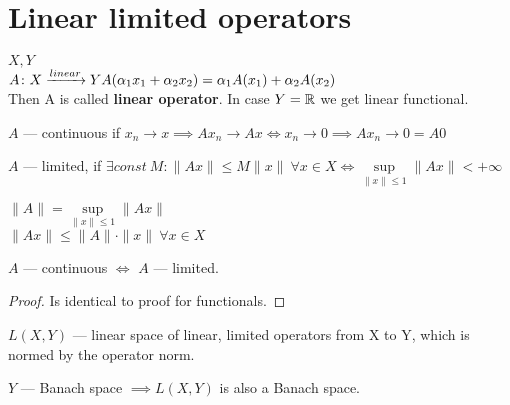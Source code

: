 \section{Linear limited operators}
\begin{defn}
  $X, Y$ \\
  $A \colon X \xrightarrow{linear} Y\\
  A(\alpha_1 x_1 + \alpha_2 x_2) = \alpha_1A(x_1) + \alpha_2 A(x_2)$ \\
  Then A is called \textbf{linear operator}. In case $Y = \mathbb{R}$ we get linear functional.
\end{defn}

\begin{defn}
  $A$ --- continuous if $x_n \to x \implies Ax_n \to Ax \iff x_n \to 0 \implies
  Ax_n \to 0 = A0$
\end{defn}

\begin{defn}
  $A$ --- limited, if $\exists const\ M : \|Ax\| \leq M \|x\|\ \forall x \in X
  \iff \sup\limits_{\|x\| \leq 1} \|Ax\| < +\infty$
\end{defn}

\begin{defn}
  $\|A\| = \sup\limits_{\|x\| \leq 1} \|Ax\|$ \\
  $\|Ax\| \leq \|A\| \cdot \|x\|\ \forall x \in X$
\end{defn}

\begin{thm}
  $A$ --- continuous $\iff$ $A$ --- limited.
\end{thm}

\begin{proof}
  Is identical to proof for functionals.
\end{proof}

\begin{note}
  $L(X, Y)$ --- linear space of linear, limited operators from X to Y, which is
  normed by the operator norm.
\end{note}

\begin{thm}
  $Y$ --- Banach space $\implies L(X, Y)$ is also a Banach space.
\end{thm}

